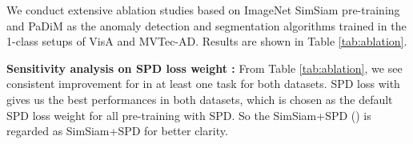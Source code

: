 \documentclass[runningheads]{llncs}
\begin{document}
\begin{table*}[!t]
	\centering
    \caption{1-class performance evaluation on VisA and MVTec-AD with PatchCore.}
    \label{tab:1cls_patchcore}
	\setlength{\tabcolsep}{7pt}
\end{table*}

We conduct extensive ablation studies based on ImageNet SimSiam pre-training and PaDiM as the anomaly detection and segmentation algorithms trained in the 1-class setups of VisA and MVTec-AD. Results are shown in Table \ref{tab:ablation}.

\noindent\textbf{Sensitivity analysis on SPD loss weight :} From Table \ref{tab:ablation}, we see consistent improvement for  in at least one task for both datasets. SPD loss with  gives us the best performances in both datasets, which is chosen as the default SPD loss weight for all pre-training with SPD. So the SimSiam+SPD () is regarded as SimSiam+SPD for better clarity.
\end{document}
